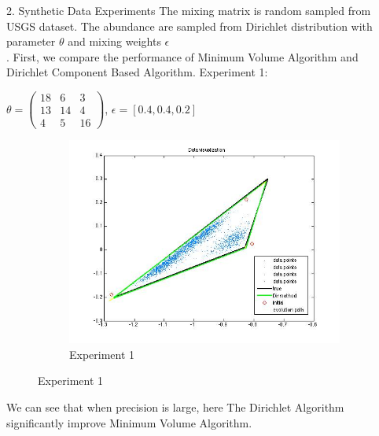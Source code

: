 \documentclass[14pt]{book}
\begin{document}
2. Synthetic Data Experiments 
The mixing matrix is random sampled from USGS dataset. The abundance are sampled from Dirichlet distribution with parameter $\theta$ and mixing weights $\epsilon$ \\ . First, we compare the performance of Minimum Volume Algorithm and Dirichlet Component Based Algorithm. 
Experiment 1: 
\par $\theta =\begin{pmatrix} 
18 & 6 &  3\\ 
 13& 14 & 4 \\ 
 4 & 5 & 16 
\end{pmatrix}$, $\epsilon = [0.4,0.4,0.2]$ \\
\begin{figure}
        \centering
        \begin{subfigure}[b]{1\textwidth}
                \centering
                \includegraphics[width=\textwidth]{r11.jpg}
                \caption{Experiment 1 }
                \label{fig:psi}
        \end{subfigure}%

        \caption{Experiment 1 }\label{fig:animals}
\end{figure}
We can see that when precision is large, here 
 The Dirichlet Algorithm significantly improve  Minimum Volume Algorithm. 
\end{document}
